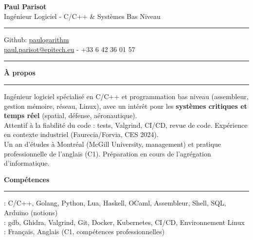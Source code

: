 \documentclass[9pt]{extarticle}
\begin{document}
\begin{center}
	{\huge\bfseries Paul Parisot}
	\\[4pt]
	{\Large Ingénieur Logiciel - C/C++ \& Systèmes Bas Niveau}
	\\
\end{center}

\par\vspace{-5pt}
\rule{\linewidth}{0.4pt}
\par\vspace{-5pt}

\begin{center}
	Github: \href{https://github.com/paulogarithm}{paulogarithm}
	\\
	\href{mailto:paul.parisot@epitech.eu}{paul.parisot@epitech.eu} - +33 6 42 36 01 57
	\\
\end{center}

\par\vspace{-10pt}
\rule{\linewidth}{0.4pt}
\par\vspace{7pt}

{\large\bfseries À propos}
\par\vspace{-8pt}
\rule{\linewidth}{0.4pt}
\par\vspace{5pt}

Ingénieur logiciel spécialisé en C/C++ et programmation bas niveau (assembleur, gestion mémoire, réseau, Linux), avec un intérêt pour les {\bfseries systèmes critiques et temps réel} (spatial, défense, aéronautique).
\\
Attentif à la fiabilité du code : tests, Valgrind, CI/CD, revue de code. Expérience en contexte industriel (Faurecia/Forvia, CES 2024).
\\
Un an d'études à Montréal (McGill University, management) et pratique professionnelle de l'anglais (C1). Préparation en cours de l'agrégation d'informatique.
\par\vspace{5pt}

{\large\bfseries Compétences}
\par\vspace{-8pt}
\rule{\linewidth}{0.4pt}
\par\vspace{5pt}

\hspace*{5pt}{\bfseries Maîtrise}: C/C++, Golang, Python, Lua, Haskell, OCaml, Assembleur, Shell, SQL, Arduino (notions)
\\
\hspace*{5pt}{\bfseries Outils}: gdb, Ghidra, Valgrind, Git, Docker, Kubernetes, CI/CD, Environnement Linux
\\
\hspace*{5pt}{\bfseries Langues}: Français, Anglais (C1, compétences professionnelles)
\end{document}
